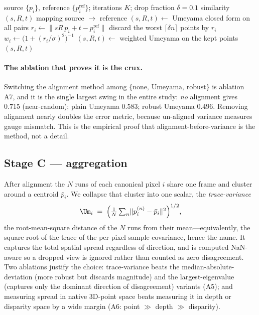 \begin{algorithm*}[t]
\caption{Robust gauge alignment (Umeyama ${+}$ IRLS)}
\label{alg:align}
\small
\begin{algorithmic}[1]
\Require source $\{p_i\}$, reference $\{p_i^{\mathrm{ref}}\}$; iterations $K$; drop fraction $\delta{=}0.1$
\Ensure similarity $(s,R,t)$ mapping source $\to$ reference
\State $(s,R,t) \gets$ Umeyama closed form on all pairs 
  \State $r_i \gets \lVert sR\,p_i + t - p_i^{\mathrm{ref}}\rVert$ 
  \State discard the worst $\lceil \delta n \rceil$ points by $r_i$
  \State $w_i \gets \big(1 + (r_i/\sigma)^2\big)^{-1}$ 
  \State $(s,R,t) \gets$ weighted Umeyama on the kept points
\EndFor
\State \Return $(s,R,t)$ 
\end{algorithmic}
\end{algorithm*}

\paragraph{The ablation that proves it is the crux.} Switching the alignment method among
$\{\text{none},\,\text{Umeyama},\,\text{robust}\}$ is ablation A7, and it is the single largest swing
in the entire study: \emph{no} alignment gives \ause\ $0.715$ (near-random); plain Umeyama
$0.583$; robust Umeyama $0.496$. Removing alignment nearly doubles the error metric, because
un-aligned variance measures gauge mismatch. This is the empirical proof that
alignment-before-variance is the method, not a detail.

\subsection{Stage C --- aggregation}
\label{sec:method-agg}

After alignment the $N$ runs of each canonical pixel $i$ share one frame and cluster around a
centroid $\bar p_i$. We collapse that cluster into one scalar, the \emph{trace-variance}
\begin{equation}
\Um_i \;=\; \Big(\tfrac1N\textstyle\sum_{n}\lVert p_i^{(n)}-\bar p_i\rVert^2\Big)^{1/2},
\label{eq:tracevar}
\end{equation}
the root-mean-square distance of the $N$ runs from their mean---equivalently, the square root of the
trace of the per-pixel sample covariance, hence the name. It captures the total spatial spread
regardless of direction, and is computed NaN-aware so a dropped view is ignored rather than counted
as zero disagreement. Two ablations justify the choice: trace-variance beats the median-absolute-
deviation (more robust but discards magnitude) and the largest-eigenvalue (captures only the dominant
direction of disagreement) variants (A5); and measuring spread in native 3D-point space beats
measuring it in depth or disparity space by a wide margin (A6: point $\gg$ depth $\gg$ disparity).

